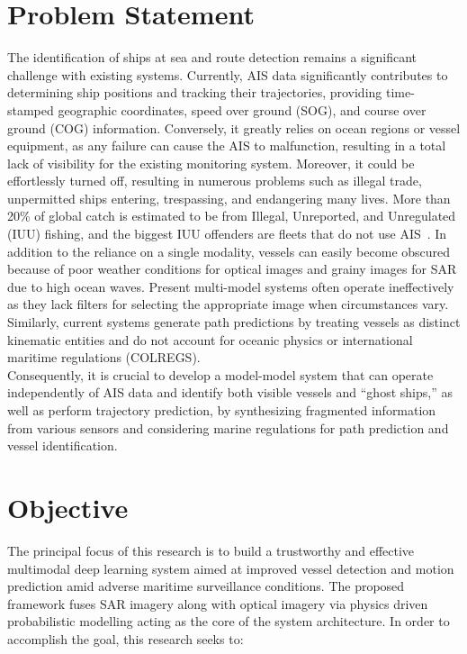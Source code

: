 \section{Problem Statement}
The identification of ships at sea and route detection remains a significant challenge with existing systems. Currently, AIS data significantly contributes to determining ship positions and tracking their trajectories, providing time-stamped geographic coordinates, speed over ground (SOG), and course over ground (COG) information. Conversely, it greatly relies on ocean regions or vessel equipment, as any failure can cause the AIS to malfunction, resulting in a total lack of visibility for the existing monitoring system. Moreover, it could be effortlessly turned off, resulting in numerous problems such as illegal trade, unpermitted ships entering, trespassing, and endangering many lives. More than 20\% of global catch is estimated to be from Illegal, Unreported, and Unregulated (IUU) fishing, and the biggest IUU offenders are fleets that do not use AIS~\cite{paolo2022xview3}. In addition to the reliance on a single modality, vessels can easily become obscured because of poor weather conditions for optical images and grainy images for SAR due to high ocean waves. Present multi-model systems often operate ineffectively as they lack filters for selecting the appropriate image when circumstances vary. Similarly, current systems generate path predictions by treating vessels as distinct kinematic entities and do not account for oceanic physics or international maritime regulations (COLREGS). \\

Consequently, it is crucial to develop a model-model system that can operate independently of AIS data and identify both visible vessels and “ghost ships,” as well as perform trajectory prediction, by synthesizing fragmented information from various sensors and considering marine regulations for path prediction and vessel identification. 




\section{Objective}
The principal focus of this research is to build a trustworthy and effective multimodal deep learning system aimed at improved vessel detection and motion prediction amid adverse maritime surveillance conditions. The proposed framework fuses SAR imagery along with optical imagery via physics driven probabilistic modelling acting as the core of the system architecture. In order to accomplish the goal, this research seeks to:

